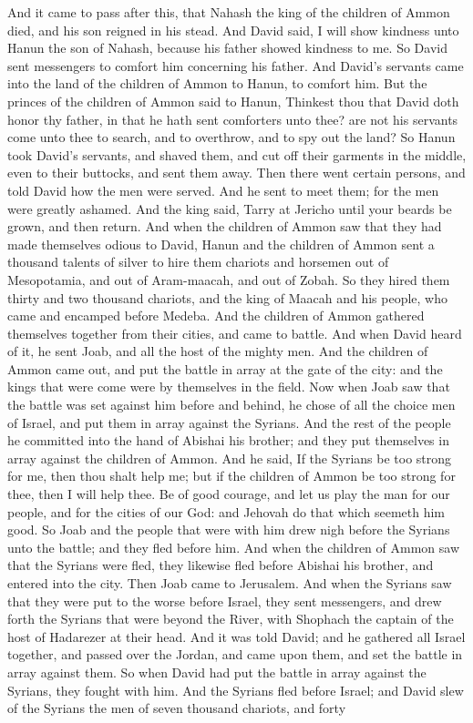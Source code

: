 And it came to pass after this, that Nahash the king of the children of Ammon died, and his son reigned in his stead. And David said, I will show kindness unto Hanun the son of Nahash, because his father showed kindness to me. So David sent messengers to comfort him concerning his father. And David’s servants came into the land of the children of Ammon to Hanun, to comfort him. But the princes of the children of Ammon said to Hanun, Thinkest thou that David doth honor thy father, in that he hath sent comforters unto thee? are not his servants come unto thee to search, and to overthrow, and to spy out the land? So Hanun took David’s servants, and shaved them, and cut off their garments in the middle, even to their buttocks, and sent them away. Then there went certain persons, and told David how the men were served. And he sent to meet them; for the men were greatly ashamed. And the king said, Tarry at Jericho until your beards be grown, and then return.  And when the children of Ammon saw that they had made themselves odious to David, Hanun and the children of Ammon sent a thousand talents of silver to hire them chariots and horsemen out of Mesopotamia, and out of Aram-maacah, and out of Zobah. So they hired them thirty and two thousand chariots, and the king of Maacah and his people, who came and encamped before Medeba. And the children of Ammon gathered themselves together from their cities, and came to battle. And when David heard of it, he sent Joab, and all the host of the mighty men. And the children of Ammon came out, and put the battle in array at the gate of the city: and the kings that were come were by themselves in the field.  Now when Joab saw that the battle was set against him before and behind, he chose of all the choice men of Israel, and put them in array against the Syrians. And the rest of the people he committed into the hand of Abishai his brother; and they put themselves in array against the children of Ammon. And he said, If the Syrians be too strong for me, then thou shalt help me; but if the children of Ammon be too strong for thee, then I will help thee. Be of good courage, and let us play the man for our people, and for the cities of our God: and Jehovah do that which seemeth him good. So Joab and the people that were with him drew nigh before the Syrians unto the battle; and they fled before him. And when the children of Ammon saw that the Syrians were fled, they likewise fled before Abishai his brother, and entered into the city. Then Joab came to Jerusalem.  And when the Syrians saw that they were put to the worse before Israel, they sent messengers, and drew forth the Syrians that were beyond the River, with Shophach the captain of the host of Hadarezer at their head. And it was told David; and he gathered all Israel together, and passed over the Jordan, and came upon them, and set the battle in array against them. So when David had put the battle in array against the Syrians, they fought with him. And the Syrians fled before Israel; and David slew of the Syrians the men of seven thousand chariots, and forty 